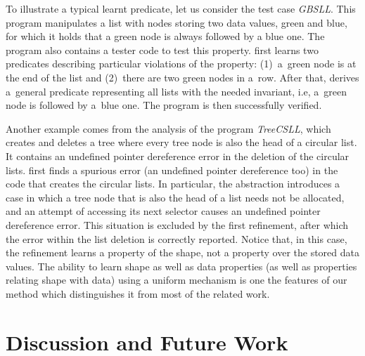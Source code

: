 {To illustrate a typical learnt predicate, let us consider the test case \emph{GBSLL}.
This program manipulates a list with nodes storing two data values, green and blue, for which it holds
that a green node is always followed by a blue one. The program also contains a tester code to test this property.
\forester{} first learns two predicates describing particular violations of the property:
(1)~a~green node is at the end of the list and
(2)~there are two green nodes in a~row.
After that, \forester{} derives a~general predicate representing all lists with the needed invariant, i.e, a~green node is followed by a~blue one.
The program is then successfully verified. 

Another example comes from the analysis of the program \emph{TreeCSLL}, which
creates and deletes a tree where every tree node is also the head of a circular
list.
%
It contains an undefined pointer dereference error in the deletion of the
circular lists. 
%
\forester{} first finds a spurious error (an undefined pointer dereference too)
in the code that creates the circular lists.
%
In particular, the abstraction introduces a case in which a tree node that is
also the head of a list needs not be allocated, and an attempt of accessing its
next selector causes an undefined pointer dereference error. 
%
This situation is excluded by the first refinement, after which the error within
the list deletion is correctly reported.
%
Notice that, in this case, the refinement learns a property of the shape, not a
property over the stored data values. 
%
%
The ability to learn shape as well as data properties (as well as properties
relating shape with data) using a uniform mechanism is one the features of our
method which distinguishes it from most of the related work.


\section{Discussion and Future Work}

}
